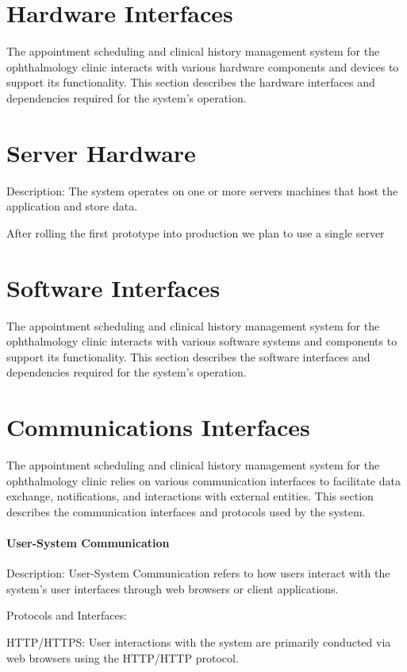 \documentclass{scrreprt}
\begin{document}
	
	\section{Hardware Interfaces}
	The appointment scheduling and clinical history management system for the ophthalmology clinic interacts with various hardware components and devices to support its functionality. This section describes the hardware interfaces and dependencies required for the system's operation.
	\section{Server Hardware}
	Description: The system operates on one or more servers machines that host the application and store data. 
	
	After rolling the first prototype into production we plan to use a single server
	
	
	\section{Software Interfaces}
	The appointment scheduling and clinical history management system for the ophthalmology clinic interacts with various software systems and components to support its functionality. This section describes the software interfaces and dependencies required for the system's operation.
	
	
	\section{Communications Interfaces}
	The appointment scheduling and clinical history management system for the ophthalmology clinic relies on various communication interfaces to facilitate data exchange, notifications, and interactions with external entities. This section describes the communication interfaces and protocols used by the system.
	\paragraph{User-System Communication}
	Description: User-System Communication refers to how users interact with the system's user interfaces through web browsers or client applications.
	
	Protocols and Interfaces:
	
	HTTP/HTTPS: User interactions with the system are primarily conducted via web browsers using the HTTP/HTTP protocol.
	
	
	
\end{document}
